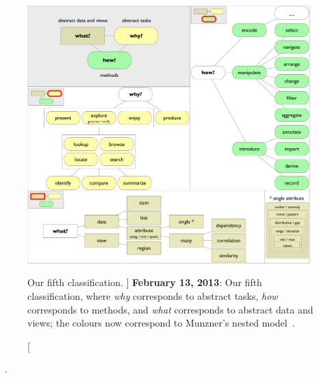 \begin{figure}
	\centering
	\includegraphics[width=0.975\textwidth]{figures/typology-13-02-13.pdf}
	\caption
	[
	    Our fifth classification.
	]
	{
	    {\bf February 13, 2013}: Our fifth classification, where \textsl{why} corresponds to abstract tasks, \textsl{how} corresponds to methods, and \textsl{what} corresponds to abstract data and views; the colours now correspond to Munzner's nested model~\cite{Munzner2009}.
	}
	\centering
	\label{app:typology:fig:13.02.13}
\end{figure}


\begin{sloppypar}
~\cite{Stephenson1967}. \end{sloppypar}

